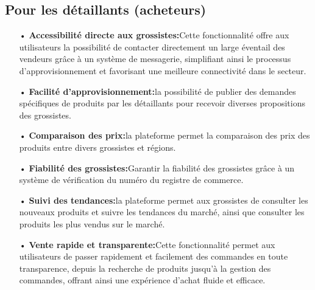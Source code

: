 \documentclass[edit,12pt,a4paper,ChapStyle,oneside,doubleinterligne]{report}
\begin{document}
\subsection{Pour les détaillants (acheteurs)}
\begin{itemize}
    \item [•] \textbf{Accessibilité directe aux grossistes:}Cette fonctionnalité offre aux utilisateurs la possibilité de contacter directement un large éventail des vendeurs grâce à un système de messagerie, simplifiant ainsi le processus d'approvisionnement et favorisant une meilleure connectivité dans le secteur.
    \item [•] \textbf{Facilité d'approvisionnement:}la possibilité de publier des demandes spécifiques de produits par les détaillants  pour recevoir diverses propositions des grossistes.
    \item [•] \textbf{Comparaison des prix:}la plateforme permet la comparaison des prix des produits entre divers grossistes et régions.
    \item [•] \textbf{Fiabilité des grossistes:}Garantir la fiabilité des grossistes grâce à un système de vérification du numéro du registre de commerce.
    \item [•] \textbf{Suivi des tendances:}la plateforme permet aux grossistes de consulter les nouveaux produits et suivre les tendances du marché, ainsi que consulter les produits les plus vendus sur le marché.
    \item [•] \textbf{Vente rapide et transparente:}Cette fonctionnalité permet aux utilisateurs de passer rapidement et facilement des commandes en toute transparence, depuis la recherche de produits jusqu'à la gestion des commandes, offrant ainsi une expérience d'achat fluide et efficace.
\end{itemize}
\end{document}
